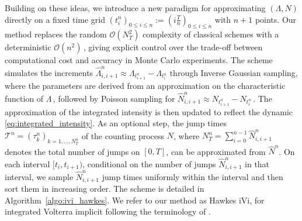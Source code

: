 \documentclass{article}
\newcommand{\1}{\mathbbm{1}}
\newcommand{\ma}{\color{magenta}}
\numberwithin{equation}{section}
\begin{document}
Building on these ideas, we introduce a new paradigm for approximating $(\Lambda, N)$ directly on a fixed time grid $\left(t^n_i\right)_{0 \leq i \leq n} := \left(i\frac{T}{n}\right)_{0 \leq i \leq n}$ with $n+1$ points. Our method replaces the random $\mathcal O(N_T^2)$ complexity of classical schemes with a deterministic $\mathcal O(n^2)\,$, giving explicit control over the trade-off between computational cost and accuracy in Monte Carlo experiments. The scheme simulates the increments $\widehat \Lambda_{i,i+1}^n \approx \Lambda_{t^n_{i+1}} - \Lambda_{t^n_i}$ through Inverse Gaussian sampling, where the parameters are derived from an approximation on the characteristic function of $\Lambda\,$, followed by Poisson sampling for $\widehat N^n_{i,i+1} \approx N_{t^n_{i+1}} - N_{t^n_i}\,$. The approximation of the integrated intensity is then updated to reflect the dynamic \eqref{eq:integrated_intensity}. As an optional step,  the jump times 
$\mathcal{T}^n = (\tau^n_k)_{k=1,\ldots,N_T^n}$ 
of the counting process ${N}$, where $N^n_T= \sum_{i=0}^{n-1} \widehat N_{i,i+1}^n$ denotes the total number of jumps on $[0,T]$,  can be {approximated} from $\widehat{N}^n$. 
On each interval $[t_i, t_{i+1})$, conditional on the number of jumps $\widehat{N}^n_{i,i+1}$ in that interval, we sample  $\widehat{N}^n_{i,i+1}$ jump times uniformly within the interval and then sort them in increasing order. The scheme is detailed in Algorithm~\ref{algo:ivi_hawkes}. We refer to our method as {Hawkes iVi}, for {integrated Volterra implicit}  following the terminology of \citet{jaber2024simulation, jaber2025simulating}.

\end{document}
